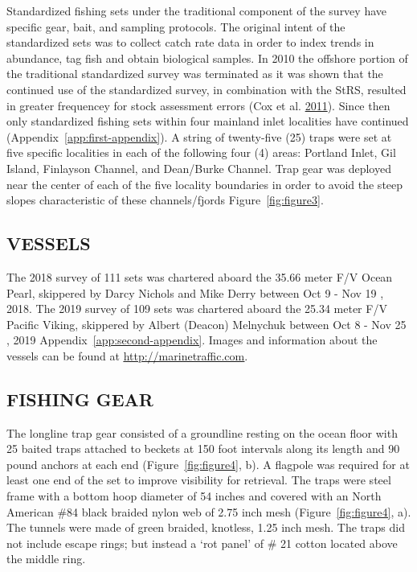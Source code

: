 \documentclass[12pt]{article}\usepackage[]{graphicx}\usepackage[]{color}
\begin{document}
Standardized fishing sets under the traditional component of the survey have specific gear, bait, and sampling protocols. The original intent of the standardized sets was to collect catch rate data in order to index trends in abundance, tag fish and obtain biological samples. In 2010 the offshore portion of the traditional standardized survey was terminated as it was shown that the continued use of the standardized survey, in combination with the StRS, resulted in greater frequencey for stock assessment errors (Cox et al. \protect\hyperlink{ref-Cox2011}{2011}). Since then only standardized fishing sets within four mainland inlet localities have continued (Appendix~\ref{app:first-appendix}). A string of twenty-five (25) traps were set at five specific localities in each of the following four (4) areas: Portland Inlet, Gil Island, Finlayson Channel, and Dean/Burke Channel. Trap gear was deployed near the center of each of the five locality boundaries in order to avoid the steep slopes characteristic of these channels/fjords Figure~\ref{fig:figure3}.

\hypertarget{vessels}{%
\subsection{VESSELS}\label{vessels}}

The 2018 survey of 111 sets was chartered aboard the 35.66 meter F/V Ocean Pearl, skippered by Darcy Nichols and Mike Derry between Oct 9 - Nov 19 , 2018. The 2019 survey of 109 sets was chartered aboard the 25.34 meter F/V Pacific Viking, skippered by Albert (Deacon) Melnychuk between Oct 8 - Nov 25 , 2019 Appendix~\ref{app:second-appendix}. Images and information about the vessels can be found at \href{http://marinetraffic.com}{\underline{http://marinetraffic.com}}.

\hypertarget{fishing-gear}{%
\subsection{FISHING GEAR}\label{fishing-gear}}

The longline trap gear consisted of a groundline resting on the ocean floor with 25 baited traps attached to beckets at 150 foot intervals along its length and 90 pound anchors at each end (Figure~\ref{fig:figure4}, b). A flagpole was required for at least one end of the set to improve visibility for retrieval. The traps were steel frame with a bottom hoop diameter of 54 inches and covered with an North American \#84 black braided nylon web of 2.75 inch mesh (Figure~\ref{fig:figure4}, a). The tunnels were made of green braided, knotless, 1.25 inch mesh. The traps did not include escape rings; but instead a `rot panel' of \# 21 cotton located above the middle ring.
\end{document}
